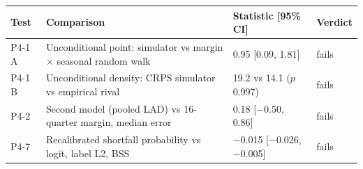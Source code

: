 \begin{tabular}{llll}
\toprule
Test & Comparison & Statistic [95\% CI] & Verdict \\
\midrule
P4-1 A & Unconditional point: simulator vs margin $\times$ seasonal random walk & 0.95 [0.09, 1.81] & fails \\
P4-1 B & Unconditional density: CRPS simulator vs empirical rival & 19.2 vs 14.1 ($p$ 0.997) & fails \\
P4-2 & Second model (pooled LAD) vs 16-quarter margin, median error & 0.18 [$-$0.50, 0.86] & fails \\
P4-7 & Recalibrated shortfall probability vs logit, label L2, BSS & $-$0.015 [$-$0.026, $-$0.005] & fails \\
\bottomrule
\end{tabular}
